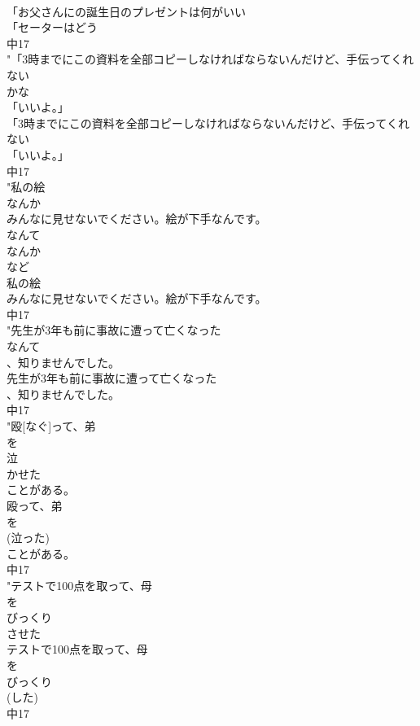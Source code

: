 \documentclass[8pt]{extreport}
\begin{document}
\begin{CJK}{UTF8}{min}
\\	「お父さんにの誕生日のプレゼントは何がいい
\\	「セーターはどう
\\	中17
\\	"「3時までにこの資料を全部コピーしなければならないんだけど、手伝ってくれ
\\	ない
\\	かな
\\	「いいよ。」
\\	「3時までにこの資料を全部コピーしなければならないんだけど、手伝ってくれ
\\	ない
\\	「いいよ。」
\\	中17
\\	"私の絵
\\	なんか
\\	みんなに見せないでください。絵が下手なんです。
\\	なんて 
\\	なんか
\\	など	
\\	私の絵
\\	みんなに見せないでください。絵が下手なんです。
\\	中17
\\	"先生が3年も前に事故に遭って亡くなった
\\	なんて
\\	、知りませんでした。
\\	先生が3年も前に事故に遭って亡くなった
\\	、知りませんでした。
\\	中17
\\	"殴[なぐ]って、弟
\\	を
\\	泣
\\	かせた
\\	ことがある。
\\	殴って、弟
\\	を
\\	(泣った)
\\	ことがある。
\\	中17
\\	"テストで100点を取って、母
\\	を
\\	びっくり
\\	させた
\\	テストで100点を取って、母
\\	を
\\	びっくり
\\	(した)
\\	中17

\end{CJK}
\end{document}
